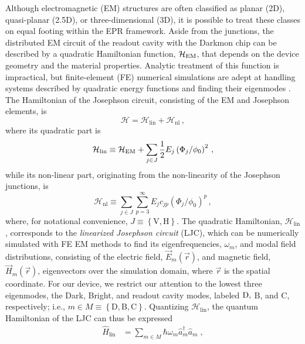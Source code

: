Although electromagnetic (EM) structures are often classified as planar
\citep{Blais2004,Wallraff2004,Barends2013,FYan2016} (2D), quasi-planar
\citep{Minev2013,Minev2016,Brecht2016,Rosenberg2017} (2.5D), or three-dimensional
\citep{Paik2011,Rigetti2012,Reagor2016-cavity,Axline2016} (3D), it
is possible to treat these classes on equal footing within the EPR
framework. Aside from the junctions, the distributed EM circuit of
the readout cavity with the Darkmon chip can be described by a quadratic
Hamiltonian function, $\mathcal{H}_{{\rm EM}}$, that depends on the
device geometry and the material properties. Analytic treatment of
this function is impractical, but finite-element (FE) numerical simulations
are adept at handling systems described by quadratic energy functions
and finding their eigenmodes \citep{Louisell1973,Jin2014}. The Hamiltonian
of the Josephson circuit, consisting of the EM and Josephson elements,
is
\begin{equation}
\mathcal{H}=\mathcal{H}_{\mathrm{lin}}+\mathcal{H}_{\mathrm{nl}}\,,
\end{equation}
where its quadratic part is 
\begin{equation}
\mathcal{H}_{\mathrm{lin}}\equiv\mathcal{H}_{{\rm EM}}+\sum_{j\in J}\frac{1}{2}E_{j}\left(\Phi_{j}/\phi_{0}\right)^{2}\,,\label{eq:HLin}
\end{equation}
while its non-linear part, originating from the non-linearity of the
Josephson junctions, is 
\begin{equation}
\mathcal{H}_{\mathrm{nl}}\equiv\sum_{j\in J}\sum_{p=3}^{\infty}E_{j}c_{jp}\left(\Phi_{j}/\phi_{0}\right)^{p}\,,
\end{equation}
where, for notational convenience, $J\equiv\left\{ \mathrm{V,H}\right\} .$
The quadratic Hamiltonian, $\mathcal{H}_{\mathrm{lin}}$, corresponds
to the \emph{linearized Josephson circuit} (LJC), which can be numerically
simulated with FE EM methods to find its eigenfrequencies, $\omega_{m}$,
and modal field distributions, consisting of the electric field, $\vec{E}_{m}\left(\vec{r}\right)$,
and magnetic field, $\vec{H}_{m}\left(\vec{r}\right)$, eigenvectors
over the simulation domain, where $\vec{r}$ is the spatial coordinate.
For our device, we restrict our attention to the lowest three eigenmodes,
the Dark, Bright, and readout cavity modes, labeled ${\rm D},$ $\mathrm{B}$,
and $\mathrm{C}$, respectively; i.e., $m\in M\equiv\left\{ \mathrm{D,B,C}\right\} $.
Quantizing $\mathcal{H}_{\mathrm{lin}}$, the quantum Hamiltonian
of the LJC can thus be expressed 
\begin{align}
\hat{H}_{\mathrm{lin}} & =\sum_{m\in M}\hbar\omega_{m}\hat{a}_{m}^{\dagger}\hat{a}_{m}\;,\label{eq:Hlin-multi}
\end{align}
